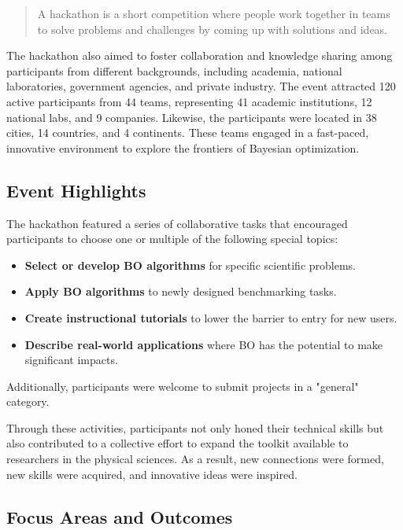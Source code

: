 \documentclass[superscriptaddress, nofootinbib,  amsmath, amssymb, preprint]{revtex4-2}
\begin{document}
\begin{quote}
A hackathon is a short competition where people work together in teams to solve problems and challenges by coming up with solutions and ideas.
\end{quote}

The hackathon also aimed to foster collaboration and knowledge sharing among participants from different backgrounds, including academia, national laboratories, government agencies, and private industry. The event attracted 120 active participants from 44 teams, representing 41 academic institutions, 12 national labs, and 9 companies. Likewise, the participants were located in 38 cities, 14 countries, and 4 continents. These teams engaged in a fast-paced, innovative environment to explore the frontiers of Bayesian optimization.

\subsection{Event Highlights}

The hackathon featured a series of collaborative tasks that encouraged participants to choose one or multiple of the following special topics:
\begin{itemize}
    \item \textbf{Select or develop BO algorithms} for specific scientific problems.
    \item \textbf{Apply BO algorithms} to newly designed benchmarking tasks.
    \item \textbf{Create instructional tutorials} to lower the barrier to entry for new users.
    \item \textbf{Describe real-world applications} where BO has the potential to make significant impacts.
\end{itemize}

Additionally, participants were welcome to submit projects in a "general" category.

Through these activities, participants not only honed their technical skills but also contributed to a collective effort to expand the toolkit available to researchers in the physical sciences. As a result, new connections were formed, new skills were acquired, and innovative ideas were inspired.

\subsection{Focus Areas and Outcomes}
\end{document}
